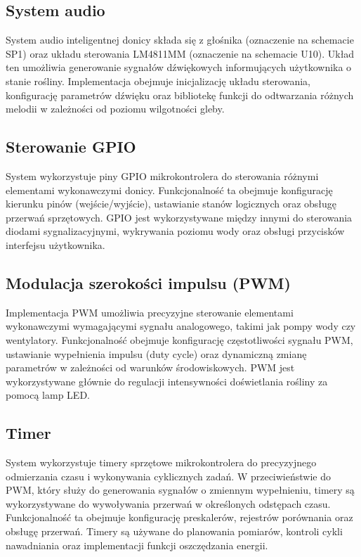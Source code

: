 \documentclass{article}
\begin{document}
\subsection{System audio}
System audio inteligentnej donicy składa się z głośnika (oznaczenie na schemacie SP1) oraz układu sterowania LM4811MM (oznaczenie na schemacie U10). Układ ten umożliwia generowanie sygnałów dźwiękowych informujących użytkownika o stanie rośliny. Implementacja obejmuje inicjalizację układu sterowania, konfigurację parametrów dźwięku oraz bibliotekę funkcji do odtwarzania różnych melodii w zależności od poziomu wilgotności gleby.

\subsection{Sterowanie GPIO}
System wykorzystuje piny GPIO mikrokontrolera do sterowania różnymi elementami wykonawczymi donicy. Funkcjonalność ta obejmuje konfigurację kierunku pinów (wejście/wyjście), ustawianie stanów logicznych oraz obsługę przerwań sprzętowych. GPIO jest wykorzystywane między innymi do sterowania diodami sygnalizacyjnymi, wykrywania poziomu wody oraz obsługi przycisków interfejsu użytkownika.

\subsection{Modulacja szerokości impulsu (PWM)}
Implementacja PWM umożliwia precyzyjne sterowanie elementami wykonawczymi wymagającymi sygnału analogowego, takimi jak pompy wody czy wentylatory. Funkcjonalność obejmuje konfigurację częstotliwości sygnału PWM, ustawianie wypełnienia impulsu (duty cycle) oraz dynamiczną zmianę parametrów w zależności od warunków środowiskowych. PWM jest wykorzystywane głównie do regulacji intensywności doświetlania rośliny za pomocą lamp LED.

\subsection{Timer}
System wykorzystuje timery sprzętowe mikrokontrolera do precyzyjnego odmierzania czasu i wykonywania cyklicznych zadań. W przeciwieństwie do PWM, który służy do generowania sygnałów o zmiennym wypełnieniu, timery są wykorzystywane do wywoływania przerwań w określonych odstępach czasu. Funkcjonalność ta obejmuje konfigurację preskalerów, rejestrów porównania oraz obsługę przerwań. Timery są używane do planowania pomiarów, kontroli cykli nawadniania oraz implementacji funkcji oszczędzania energii.
\end{document}
